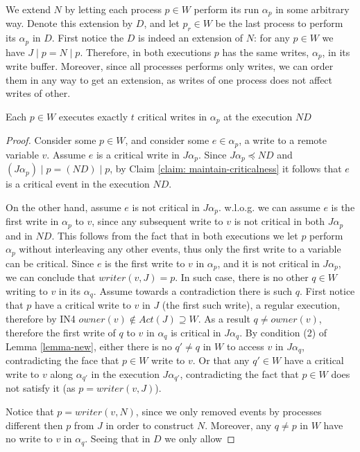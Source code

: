 We extend $N$ by letting each process $p \in W$ perform its run $\alpha_p$ in some arbitrary way. Denote this extension by $D$, and let $p_r \in W$ be the last process to perform its $\alpha_p$ in $D$. First notice the $D$ is indeed an extension of $N$: for any $p \in W$ we have $J \mid p = N \mid p$. Therefore, in both executions $p$ has the same writes, $\alpha_p$, in its write buffer. Moreover, since all processes performs only writes, we can order them in any way to get an extension, as writes of one process does not affect writes of other.

\begin{claim-subsection}
	Each $p \in W$ executes exactly $t$ critical writes in $\alpha_p$ at the execution $N D$
\end{claim-subsection}

\begin{proof}
	Consider some $p \in W$, and consider some $e \in \alpha_p$, a write to a remote variable $v$. Assume $e$ is a critical write in $J \alpha_p$. Since $J \alpha_p \preceq N D$ and $(J \alpha_p) \mid p = (N D) \mid p$, by Claim \ref{claim: maintain-criticalness} it follows that $e$ is a critical event in the execution $N D$.
	
	On the other hand, assume $e$ is not critical in $J \alpha_p$. w.l.o.g. we can assume $e$ is the first write in $\alpha_p$ to $v$, since any subsequent write to $v$ is not critical in both $J \alpha_p$ and in $N D$. This follows from the fact that in both executions we let $p$ perform $\alpha_p$ without interleaving any other events, thus only the first write to a variable can be critical. Since $e$ is the first write to $v$ in $\alpha_p$, and it is not critical in $J \alpha_p$, we can conclude that $writer(v,J) = p$. In such case, there is no other $q \in W$ writing to $v$ in its $\alpha_q$. Assume towards a contradiction there is such $q$. First notice that $p$ have a critical write to $v$ in $J$ (the first such write), a regular execution, therefore by IN4 $owner(v) \notin Act(J) \supseteq W$. As a result $q \neq owner(v)$, therefore the first write of $q$ to $v$ in $\alpha_q$ is critical in $J \alpha_q$. By condition (2) of Lemma \ref{lemma-new}, either there is no $q' \neq q$ in $W$ to access $v$ in $J \alpha_q$, contradicting the face that $p \in W$ write to $v$. Or that any $q' \in W$ have a critical write to $v$ along $\alpha_{q'}$ in the execution $J \alpha_{q'}$, contradicting the fact that $p \in W$ does not satisfy it (as $p = writer(v,J)$).
	
	Notice that $p = writer(v,N)$, since we only removed events by processes different then $p$ from $J$ in order to construct $N$. Moreover, any $q \neq p$ in $W$ have no write to $v$ in $\alpha_q$. Seeing that in $D$ we only allow
	

\end{proof}
